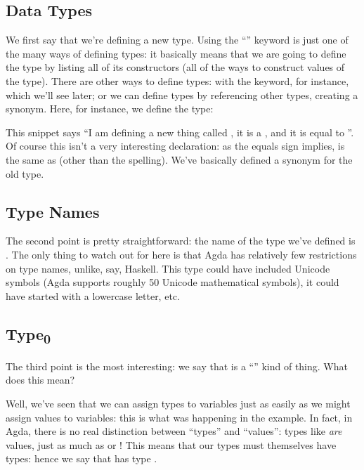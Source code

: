 \subsection{Data Types}
We first say that we're defining a new  type.
Using the ``'' keyword is just one of the many ways of
defining types: it basically means that we are going to define the type by
listing all of its constructors (all of the ways to construct values of the
type).
There are other ways to define types: with the  keyword, for
instance, which we'll see later; or we can define types by referencing other
types, creating a synonym.
Here, for instance, we define the  type:
\begin{agdalisting*}
\end{agdalisting*}
This snippet says ``I am defining a new thing called , it
is a , and it is equal to ''.
Of course this isn't a very interesting declaration: as the equals sign implies,
 is the same as  (other than the
spelling).
We've basically defined a synonym for the old type.

\subsection{Type Names}
The second point is pretty straightforward: the name of the type we've defined
is .
The only thing to watch out for here is that Agda has relatively few
restrictions on type names, unlike, say, Haskell.
This type could have included Unicode symbols (Agda supports roughly 50 Unicode
mathematical symbols), it could have started with a lowercase letter, etc.

\subsection{Type\textsubscript{0}}
The third point is the most interesting: we say that  is a
``'' kind of thing.
What does this mean?

Well, we've seen that we can assign types to variables just as easily as we
might assign values to variables: this is what was happening in the
 example.
In fact, in Agda, there is no real distinction between ``types'' and ``values'':
types like  \emph{are} values, just as much as
 or !
This means that our types must themselves have types: hence we say that
 has type .

